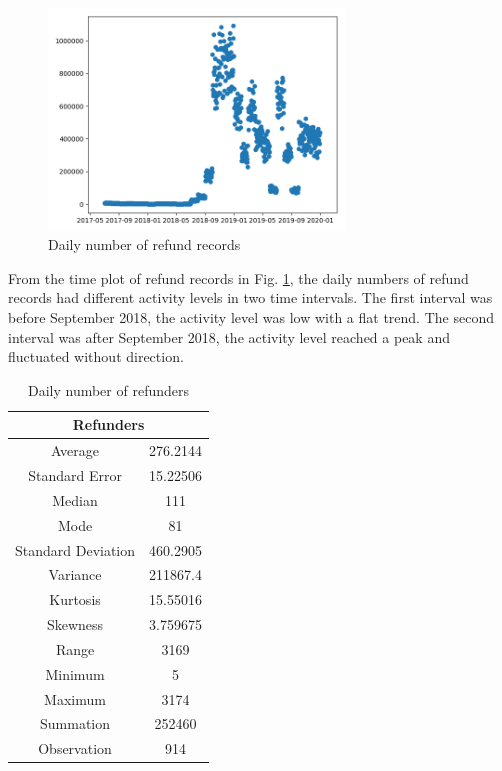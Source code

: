 \begin{figure}[htb]
\includegraphics[width=0.7\textwidth]{gfx/refund-records.png}
\caption{Daily number of refund records}
\label{fig:refund-records}
\end{figure}

From the time plot of refund records in Fig. \ref{fig:refund-records}, the daily numbers of refund records had different activity levels in two time intervals. The first interval was before September 2018, the activity level was low with a flat trend. The second interval was after September 2018, the activity level reached a peak and fluctuated without direction.

\begin{table}[h]
\caption{Daily number of refunders}
\label{tab:refunders}
\renewcommand\arraystretch{0.7}
\begin{tabular}{@{}cc@{}}
\toprule
\multicolumn{2}{c}{Refunders} \\
\midrule
Average                       & 276.2144           \\
Standard Error                & 15.22506           \\
Median                        & 111                \\
Mode                          & 81                 \\
Standard Deviation            & 460.2905           \\
Variance                      & 211867.4           \\
Kurtosis                      & 15.55016           \\
Skewness                      & 3.759675           \\
Range                         & 3169               \\
Minimum                       & 5                  \\
Maximum                       & 3174               \\
Summation                     & 252460             \\
Observation                   & 914                \\
\bottomrule
\end{tabular}
\end{table}

